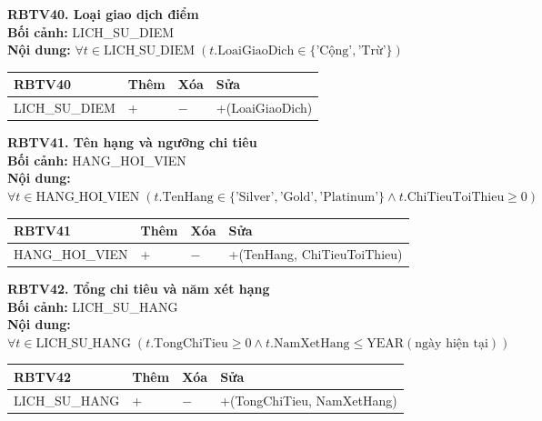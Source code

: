 \documentclass[11pt, a4paper]{article}
\begin{document}
\vspace{0.8em}
\textbf{RBTV40. Loại giao dịch điểm} \\
\textbf{Bối cảnh:} LICH\_SU\_DIEM \\
\textbf{Nội dung:} $\forall t \in \text{LICH\_SU\_DIEM} \; (t.\text{LoaiGiaoDich} \in \{\text{'Cộng'}, \text{'Trừ'}\})$

\vspace{0.3em}
\begin{small}
\begin{tabularx}{\textwidth}{| C{4.2cm} | C{2cm} | C{2cm} | Y |}
\hline
\textbf{RBTV40} & \textbf{Thêm} & \textbf{Xóa} & \textbf{Sửa} \\
\hline
LICH\_SU\_DIEM & + & $-$ & +(LoaiGiaoDich) \\
\hline
\end{tabularx}
\end{small}

\vspace{0.8em}
\textbf{RBTV41. Tên hạng và ngưỡng chi tiêu} \\
\textbf{Bối cảnh:} HANG\_HOI\_VIEN \\
\textbf{Nội dung:} $\forall t \in \text{HANG\_HOI\_VIEN} \; (t.\text{TenHang} \in \{\text{'Silver'}, \text{'Gold'}, \text{'Platinum'}\} \land t.\text{ChiTieuToiThieu} \ge 0)$

\vspace{0.3em}
\begin{small}
\begin{tabularx}{\textwidth}{| C{4.2cm} | C{2cm} | C{2cm} | Y |}
\hline
\textbf{RBTV41} & \textbf{Thêm} & \textbf{Xóa} & \textbf{Sửa} \\
\hline
HANG\_HOI\_VIEN & + & $-$ & +(TenHang, ChiTieuToiThieu) \\
\hline
\end{tabularx}
\end{small}

\vspace{0.8em}
\textbf{RBTV42. Tổng chi tiêu và năm xét hạng} \\
\textbf{Bối cảnh:} LICH\_SU\_HANG \\
\textbf{Nội dung:} $\forall t \in \text{LICH\_SU\_HANG} \; (t.\text{TongChiTieu} \ge 0 \land t.\text{NamXetHang} \le \text{YEAR}(\text{ngày hiện tại}))$

\vspace{0.3em}
\begin{small}
\begin{tabularx}{\textwidth}{| C{4.2cm} | C{2cm} | C{2cm} | Y |}
\hline
\textbf{RBTV42} & \textbf{Thêm} & \textbf{Xóa} & \textbf{Sửa} \\
\hline
LICH\_SU\_HANG & + & $-$ & +(TongChiTieu, NamXetHang) \\
\hline
\end{tabularx}
\end{small}
\end{document}
